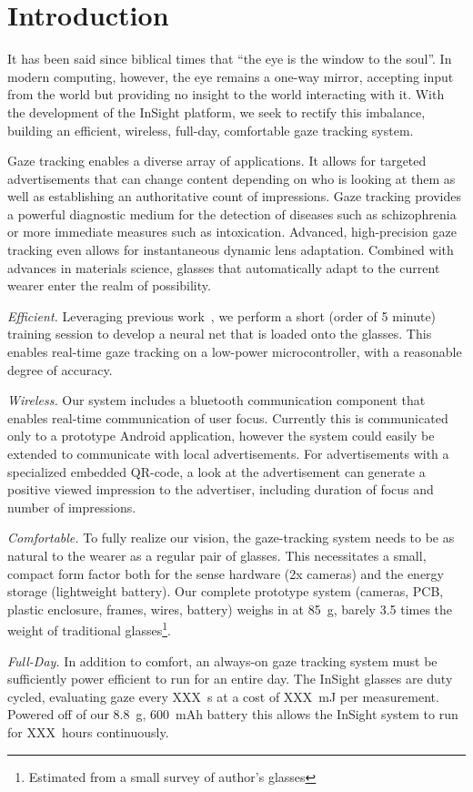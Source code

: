 \section{Introduction}
\label{sec:intro}

It has been said since biblical times that ``the eye is the window to the
soul''. In modern computing, however, the eye remains a one-way mirror,
accepting input from the world but providing no insight to the world
interacting with it. With the development of the InSight platform, we seek to
rectify this imbalance, building an efficient, wireless, full-day,
comfortable gaze tracking system.

Gaze tracking enables a diverse array of applications. It allows for targeted
advertisements that can change content depending on who is looking at them as
well as establishing an authoritative count of impressions. Gaze tracking
provides a powerful diagnostic medium for the detection of diseases such as
schizophrenia or more immediate measures such as intoxication. Advanced,
high-precision gaze tracking even allows for instantaneous dynamic lens
adaptation. Combined with advances in materials science, glasses that
automatically adapt to the current wearer enter the realm of possibility.

{\em Efficient.} Leveraging previous work~\cite{gaze-neural-net, others?}, we
perform a short (order of 5 minute) training session to develop a neural net
that is loaded onto the glasses. This enables real-time gaze tracking on a
low-power microcontroller, with a reasonable degree of accuracy.

{\em Wireless.} Our system includes a bluetooth communication
component that enables real-time communication of user focus. Currently this
is communicated only to a prototype Android application, however the system
could easily be extended to communicate with local advertisements. For
advertisements with a specialized embedded QR-code, a look at the
advertisement can generate a positive viewed impression to the advertiser,
including duration of focus and number of impressions.

{\em Comfortable.} To fully realize our vision, the gaze-tracking system needs to
be as natural to the wearer as a regular pair of glasses. This necessitates a
small, compact form factor both for the sense hardware (2x cameras) and the
energy storage (lightweight battery). Our complete prototype system (cameras,
PCB, plastic enclosure, frames, wires, battery) weighs in at 85~g, barely 3.5
times the weight of traditional glasses\footnote{Estimated from a small survey
of author's glasses}.

{\em Full-Day.} In addition to comfort, an always-on gaze tracking system must
be sufficiently power efficient to run for an entire day. The InSight glasses
are duty cycled, evaluating gaze every XXX~s at a cost of XXX~mJ per
measurement. Powered off of our 8.8~g, 600~mAh battery this allows the InSight
system to run for XXX~hours continuously.

